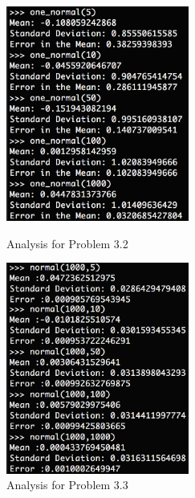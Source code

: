 \documentclass[12pt]{article}
\begin{document}
\begin{figure}[ht]
	\centering
	\begin{minipage}[b]{0.47\linewidth}
		\includegraphics[width = 6cm]{P3_2.PNG}
		\caption{Analysis for Problem 3.2}
		\label{fig:minipage1}
	\end{minipage}
	\quad
	\begin{minipage}[b]{0.47\linewidth}
		\includegraphics[width = 6cm]{P3_3.PNG}
		\caption{Analysis for Problem 3.3}
		\label{fig:minipage2}
	\end{minipage}
\end{figure}
\end{document}
